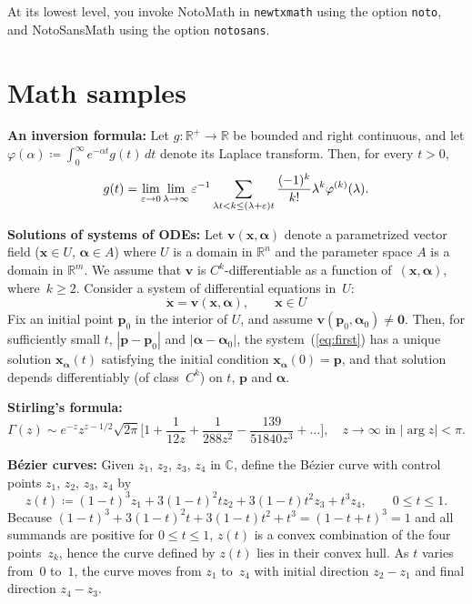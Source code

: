 \documentclass[]{article}
\begin{document}
At its lowest level, you invoke NotoMath in {\tt newtxmath} using the option {\tt noto}, and NotoSansMath using the option  {\tt notosans}.

\section*{Math samples}
\def\bE{\mathbf{E}}
\def\bB{\mathbf{B}}
\def\bJ{\mathbf{J}}

\def\bx{\mathbf{x}}
\def\by{\mathbf{y}}
\def\bv{\mathbf{v}}
\def\bp{\mathbf{p}}
\def\bxdot{\mathbf{\dot x}}
\def\bal{\boldsymbol{\alpha}}
\def\bphi{\boldsymbol{\varphi}}
\def\e{\varepsilon}
\textbf{An inversion formula:} Let $g:\mathbb{R}^+\to \mathbb{R}$
 be bounded and right continuous, and let
$\varphi(\alpha)\coloneq\int_0^\infty e^{-\alpha t}g(t)\,dt$ denote its Laplace transform. Then, for every $t>0$,
\begin{equation}
g(t)=\lim_{\mathstrut\e\to 0}\lim_{\mathstrut\lambda\to\infty}\e^{-1}\sum_{\lambda t<k\le (\lambda+\e)t}
\frac{(-1)^k}{k!}\lambda^k\varphi ^{(k)}(\lambda).
\end{equation}

\textbf{Solutions of systems of ODEs:} Let $\bv(\bx,\bal)$ denote a parametrized vector field ($\bx\in U$, $\bal\in A$) where $U$ is a domain in $\mathbb{R}^n$ and the parameter space $A$ is a domain in $\mathbb{R}^m$. We assume that $\bv$ is $C^k$-differentiable as a function of~$(\bx,\bal)$, where~$k\ge 2$. Consider a system of differential equations in~$U$:
\begin{equation}
\bxdot=\bv(\bx,\bal),\qquad \bx\in U\label{eq:first}
\end{equation}
 Fix an initial point $\bp_0$ in the interior of $U$, and assume $\bv(\bp_0,\bal_0)\neq\mathbf{0}$. Then, for sufficiently small $t$, $|\bp-\bp_0|$ and $|\bal-\bal_0|$, the system~(\ref{eq:first}) has a unique solution $\bx_{\bal}(t)$  satisfying the initial condition $\bx_{\bal}(0)=\bp$, and that solution depends differentiably (of class~$C^k$) on $t$, $\bp$ and $\bal$.

\textbf{Stirling's formula:} 
\begin{equation}
\Gamma(z)\sim e^{-z}z^{z-1/2}\sqrt{2\pi}\bigg[1+\frac{1}{12z}+\frac{1}{288z^2}-\frac{139}{51840z^3}+\ldots\bigg],\quad z\to\infty \text{ in $|\arg z|<\pi$}.
\end{equation}

\textbf{B\'ezier curves:} Given $z_1$,
$z_2$,
$z_3$,
$z_4$ in  $\mathbb{C}$, define  the B\'ezier
curve with control points $z_1$, $z_2$, $z_3$, $z_4$ by
\[z(t)\coloneq(1-t)^3z_1+3(1-t)^2tz_2+3(1-t)t^2z_3+t^3z_4,\qquad 0\le t\le 1.\]
Because $(1-t)^3+3(1-t)^2t+3(1-t)t^2+t^3=(1-t+t)^3=1$
and all summands are positive for $0\le t\le1$, $z(t)$
is a convex combination of the four points~$z_k$, hence
the curve defined by $z(t)$ lies in their convex hull. As $t$ varies from~$0$ to~$1$, the curve moves from
$z_1$ to~$z_4$ with initial direction $z_2-z_1$ and final direction $z_4-z_3$. 
\end{document}
